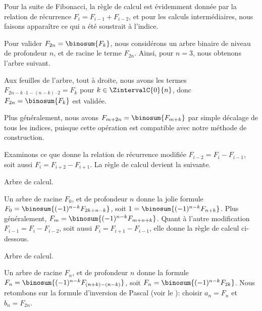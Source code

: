 Pour la suite de Fibonacci, la règle de calcul est évidemment donnée par la relation de récurrence $F_{i} = F_{i-1} + F_{i-2}$, et pour les calculs intermédiaires, nous faisons apparaître ce qui a été soustrait à l'indice.

%
            {\intertree}{}

Pour valider $F_{2n} = \binosum{F_k}$, nous considérons un arbre binaire de niveau de profondeur $n$, et de racine le terme $F_{2n}$.
Ainsi, pour $n=3$, nous obtenons l'arbre suivant.


Aux feuilles de l'arbre, tout à droite, nous avons les termes 
$F_{2n - k\cdot1 - (n-k)\cdot2} = F_k$
pour $k \in \ZintervalC{0}{n}$,
donc
$F_{2n} = \binosum{F_k}$ est validée.


\begin{remark}
	Plus généralement, nous avons
	$F_{m+2n} = \binosum{F_{m+k}}$
	par simple décalage de tous les indices,
	puisque cette opération est compatible avec notre méthode de construction.
\end{remark}




\begin{remark}
	Examinons ce que donne la relation de récurrence modifiée $F_{i-2} = F_{i} - F_{i-1}$, soit aussi $F_i = F_{i+2} - F_{i+1}$.
	La règle de calcul devient la suivante.

    \begin{center}
    	\itshape\centering
        
    
        Arbre de calcul.
    \end{center}
    
    Un arbre de racine $F_0$, et de profondeur $n$ donne la jolie formule
    $F_{0} = \binosum{(-1)^{n-k} F_{2k + n - k}}$,
    soit
    $1 = \binosum{(-1)^{n-k} F_{n + k}}$.
    Plus généralement,
    $F_{m} = \binosum{(-1)^{n-k} F_{m + n + k}}$.
    Quant à l'autre modification $F_{i-1} = F_{i} - F_{i-2}$, soit aussi $F_i = F_{i+1} - F_{i-1}$, elle donne la règle de calcul ci-dessous.

    \begin{center}
    	\itshape\centering
        
    
        Arbre de calcul.
    \end{center}
    
    Un arbre de racine $F_n$, et de profondeur $n$ donne la formule
    $F_{n} = \binosum{(-1)^{n-k} F_{(n + k) - (n - k)}}$,
    soit
    $F_{n} = \binosum{(-1)^{n-k} F_{2 k}}$.
    Nous retombons sur la formule d'inversion de Pascal (voir le ):
    choisir $a_n = F_n$ et $b_n = F_{2n}$. 
\end{remark}


